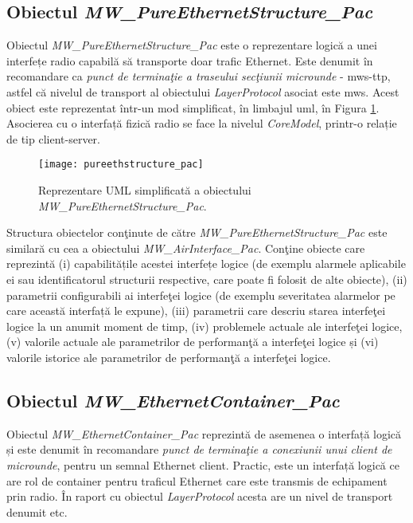 \subsection{Obiectul \textit{MW\_PureEthernetStructure\_Pac}}

Obiectul \textit{MW\_PureEthernetStructure\_Pac} este o reprezentare logică a unei interfețe radio capabilă să transporte doar trafic Ethernet. Este denumit în recomandare ca \textit{punct de terminaţie a traseului secţiunii microunde} - \gls{mws-ttp}, astfel că nivelul de transport al obiectului \textit{LayerProtocol} asociat este \gls{mws}. Acest obiect este reprezentat într-un mod simplificat, în limbajul \gls{uml}, în Figura \ref{fig:pureethstructure_pac}. Asocierea cu o interfață fizică radio se face la nivelul \textit{CoreModel}, printr-o relație de tip client-server.

\begin{figure}[h]
	\centering
	\texttt{[image: pureethstructure\_pac]}
	\caption{Reprezentare UML simplificată a obiectului \textit{MW\_PureEthernetStructure\_Pac}.}
	\label{fig:pureethstructure_pac}
\end{figure}

Structura obiectelor conţinute de către \textit{MW\_PureEthernetStructure\_Pac} este similară cu cea a obiectului \textit{MW\_AirInterface\_Pac}. Conţine obiecte care reprezintă (i) capabilitățile acestei interfețe logice (de exemplu alarmele aplicabile ei sau identificatorul structurii respective, care poate fi folosit de alte obiecte), (ii) parametrii configurabili ai interfeţei logice (de exemplu severitatea alarmelor pe care această interfață le expune), (iii) parametrii care descriu starea interfeţei logice la un anumit moment de timp, (iv) problemele actuale ale interfeţei logice, (v) valorile actuale ale parametrilor de performanţă a interfeţei logice și (vi) valorile istorice ale parametrilor de performanţă a interfeţei logice.

\subsection{Obiectul \textit{MW\_EthernetContainer\_Pac}}

Obiectul \textit{MW\_EthernetContainer\_Pac} reprezintă de asemenea o interfață logică și este denumit în recomandare \textit{punct de terminaţie a conexiunii unui client de microunde}, pentru un semnal Ethernet client. Practic, este un interfață logică ce are rol de container pentru traficul Ethernet care este transmis de echipament prin radio. În raport cu obiectul \textit{LayerProtocol} acesta are un nivel de transport denumit \gls{etc}.


